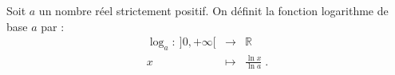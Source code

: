             \begin{defi}
                  Soit $a$ un nombre r\'eel strictement positif.
                  On d\'efinit la fonction logarithme de base $a$ par :
                        \begin{equation*}
                              \begin{array}{rcl}
                                    \log_a :\ ]0,+\infty[ & \rightarrow & \mathbb{R}                        \\
                                                        x & \mapsto     & \frac{\ln x}{\ln a}               \;.
                              \end{array}
                        \end{equation*}
            \end{defi}
      




\TCDLessonStyleOff
\clearpage
\providecommand{\ivec}{\vec{\imath}}
\providecommand{\jvec}{\vec{\jmath}}
\providecommand{\Oij}{$(O,\ivec,\jvec)$ }

